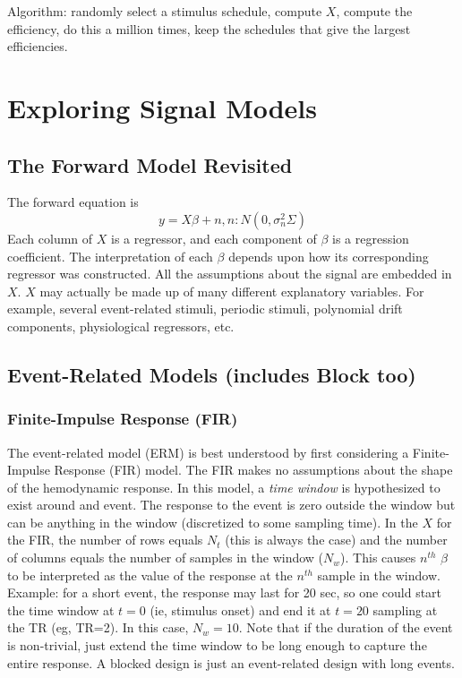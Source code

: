 \documentclass{article}
\begin{document}
\noindent
Algorithm: randomly select a stimulus schedule, compute $X$, compute
the efficiency, do this a million times, keep the schedules that give
the largest efficiencies. 

\section{Exploring Signal Models}

\subsection{The Forward Model Revisited}

\noindent
The forward equation is
\begin{equation}
y = X \beta + n, n: N(0,\sigma_n^2 \Sigma)
\end{equation}
Each column of $X$ is a regressor, and each component of $\beta$ is a
regression coefficient. The interpretation of each $\beta$ depends
upon how its corresponding regressor was constructed.  All the
assumptions about the signal are embedded in $X$. $X$ may actually be
made up of many different explanatory variables. For example, several
event-related stimuli, periodic stimuli, polynomial drift components,
physiological regressors, etc.

\subsection{Event-Related Models (includes Block too)}


\subsubsection{Finite-Impulse Response (FIR)}

\noindent
The event-related model (ERM) is best understood by first considering
a Finite-Impulse Response (FIR) model. The FIR makes no assumptions
about the shape of the hemodynamic response. In this model, a {\em
time window} is hypothesized to exist around and event. The response
to the event is zero outside the window but can be anything in the
window (discretized to some sampling time). In the $X$ for the FIR,
the number of rows equals $N_t$ (this is always the case) and the
number of columns equals the number of samples in the window
($N_w$). This causes $n^{th}$ $\beta$ to be interpreted as the value
of the response at the $n^{th}$ sample in the window. Example: for a
short event, the response may last for 20 sec, so one could start the
time window at $t=0$ (ie, stimulus onset) and end it at $t=20$
sampling at the TR (eg, TR=2). In this case, $N_w = 10$. Note that if
the duration of the event is non-trivial, just extend the time window
to be long enough to capture the entire response. A blocked design is
just an event-related design with long events.\\
\end{document}
